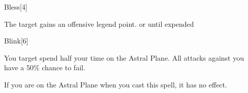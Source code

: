 \begin{spellsection}[Mass]{Bless}[4]
    \begin{spellheader}
    \end{spellheader}
    \begin{spellcontent}
        \begin{spelltargetinginfo}
        \end{spelltargetinginfo}
        \begin{spelleffects}
            \spelleffect The target gains an offensive legend point.
            \spelldur \durshort or until expended
        \end{spelleffects}
    \end{spellcontent}
    \begin{spellfooter}
        \miscastexplode
    \end{spellfooter}
\end{spellsection}

\begin{spellsection}{Blink}[6]
    \begin{spellheader}
    \end{spellheader}
    \begin{spellcontent}
        \begin{spelltargetinginfo}
        \end{spelltargetinginfo}
        \begin{spelleffects}
            \spelleffect You target spend half your time on the Astral Plane.
            All attacks against you have a 50\% chance to fail.
            \spelldur \durshort \dismissable
        \end{spelleffects}
    \end{spellcontent}
    \begin{spellfooter}
        \spellnotes If you are on the Astral Plane when you cast this spell, it has no effect.
        \miscastexplode
    \end{spellfooter}
\end{spellsection}

